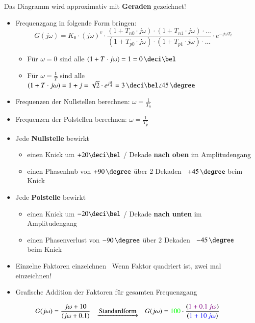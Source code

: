 Das Diagramm wird approximativ mit \textbf{Geraden} gezeichnet!

\begin{itemize}
    \item Frequenzgang in folgende Form bringen:
        $$ G(j \omega) = K_0 \cdot (j \omega)^v \cdot \frac{(1 + T_{n0} \cdot j \omega)\cdot (1 + T_{n1} \cdot j \omega) \cdot \ldots}
        {(1 + T_{p0} \cdot j \omega)\cdot (1 + T_{p1} \cdot j \omega) \cdot \ldots} \cdot e^{- j \omega T_t} $$
    \begin{itemize}
        \item Für $\omega = 0$ sind alle $(1 + T \cdot j \omega) = 1 = 0 \, \deci \bel$
        \item Für $\omega = \frac{1}{T}$ sind alle  $(1 + T \cdot j \omega) = 1 + j = \sqrt{2} \cdot e^{j \frac{\pi}{4}} 
            = 3 \, \deci \bel \angle 45 \, \degree$
    \end{itemize}
    \item Frequenzen der Nullstellen berechnen: $\omega = \frac{1}{T_n}$
    \item Frequenzen der Polstellen berechnen: $\omega = \frac{1}{T_p}$


    \item Jede \textbf{Nullstelle} bewirkt
    \begin{itemize}
        \item einen Knick um $+ 20 \deci \bel$ / Dekade \textbf{nach oben} im Amplitudengang
        \item einen Phasenhub von $+ 90 \, \degree$ über 2 Dekaden \textrightarrow\ $+ 45 \, \degree$ beim Knick
    \end{itemize}
    \item Jede \textbf{Polstelle} bewirkt
    \begin{itemize}
        \item einen Knick um $- 20 \deci \bel$ / Dekade \textbf{nach unten} im Amplitudengang
        \item einen Phasenverlust von $- 90 \, \degree$ über 2 Dekaden \textrightarrow\ $- 45 \, \degree$ beim Knick
    \end{itemize}
    \item Einzelne Faktoren einzeichnen \textrightarrow\ Wenn Faktor quadriert ist, zwei mal einzeichnen!
    \item Grafische Addition der Faktoren für gesamten Frequenzgang
\end{itemize}


\vspace{-0.2cm}
$$ G(j \omega) = \frac{j \omega + 10}{(j \omega + 0.1)} \quad  \underrightarrow{\text{ Standardform }} \quad 
  G(j \omega) = {\color{green}100} \cdot \frac{({\color{violet}1 + 0.1 \, j \omega})}{({\color{blue} 1 + 10 \, j \omega})} $$

